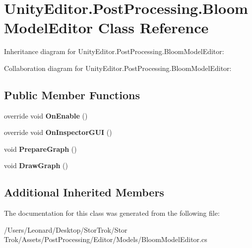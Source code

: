 \hypertarget{class_unity_editor_1_1_post_processing_1_1_bloom_model_editor}{}\section{Unity\+Editor.\+Post\+Processing.\+Bloom\+Model\+Editor Class Reference}
\label{class_unity_editor_1_1_post_processing_1_1_bloom_model_editor}


Inheritance diagram for Unity\+Editor.\+Post\+Processing.\+Bloom\+Model\+Editor\+:


Collaboration diagram for Unity\+Editor.\+Post\+Processing.\+Bloom\+Model\+Editor\+:
\subsection*{Public Member Functions}
\begin{DoxyCompactItemize}
\item 
\mbox{\label{class_unity_editor_1_1_post_processing_1_1_bloom_model_editor_a9e243b49c284dfd0018e7eb8c03b0076}} 
override void {\bfseries On\+Enable} ()
\item 
\mbox{\label{class_unity_editor_1_1_post_processing_1_1_bloom_model_editor_a8ae605305e02f59af174837e93ff5b02}} 
override void {\bfseries On\+Inspector\+G\+UI} ()
\item 
\mbox{\label{class_unity_editor_1_1_post_processing_1_1_bloom_model_editor_aef1c3035ae1a315f947e7a9a142bafd8}} 
void {\bfseries Prepare\+Graph} ()
\item 
\mbox{\label{class_unity_editor_1_1_post_processing_1_1_bloom_model_editor_a53d75ccee84ca82e213efc09700fdffd}} 
void {\bfseries Draw\+Graph} ()
\end{DoxyCompactItemize}
\subsection*{Additional Inherited Members}


The documentation for this class was generated from the following file\+:\begin{DoxyCompactItemize}
\item 
/\+Users/\+Leonard/\+Desktop/\+Stor\+Trok/\+Stor Trok/\+Assets/\+Post\+Processing/\+Editor/\+Models/Bloom\+Model\+Editor.\+cs\end{DoxyCompactItemize}
